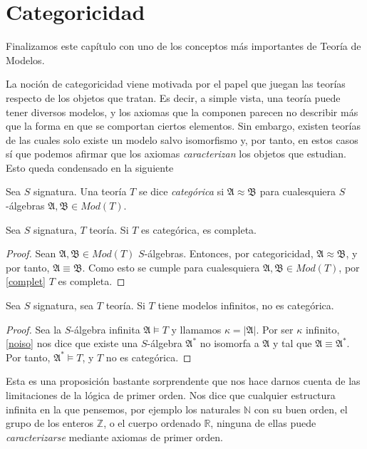 \section{Categoricidad}

Finalizamos este capítulo con uno de los conceptos más importantes de Teoría de Modelos. 

La noción de categoricidad viene motivada por el papel que juegan las teorías respecto de los objetos que tratan. Es decir, a simple vista, una teoría puede tener diversos modelos, y los axiomas que la componen parecen no describir más que la forma en que se comportan ciertos elementos. Sin embargo, existen teorías de las cuales solo existe un modelo salvo isomorfismo y, por tanto, en estos casos sí que podemos afirmar que los axiomas \textit{caracterizan} los objetos que estudian. Esto queda condensado en la siguiente 

\begin{definition}
Sea $S$ signatura. Una teoría $T$ se dice \textit{categórica} si $\mathfrak{A} \approx \mathfrak{B}$ para cualesquiera $S$-álgebras $\mathfrak{A}, \mathfrak{B} \in Mod(T)$. 
\end{definition}

\begin{prop}
Sea $S$ signatura, $T$ teoría. Si $T$ es categórica, es completa.
\end{prop}
\begin{proof}
Sean $\mathfrak{A}, \mathfrak{B} \in Mod(T)$ $S$-álgebras. Entonces, por categoricidad, $\mathfrak{A} \approx \mathfrak{B}$, y por tanto, $\mathfrak{A} \equiv \mathfrak{B}$. Como esto se cumple para cualesquiera $\mathfrak{A}, \mathfrak{B} \in Mod(T)$, por \ref{complet} $T$ es completa.
\end{proof}

\begin{prop}\label{infnocat}
Sea $S$ signatura, sea $T$ teoría. Si $T$ tiene modelos infinitos, no es categórica.
\end{prop}
\begin{proof}
Sea la $S$-álgebra infinita $\mathfrak{A}\vDash T$ y llamamos $\kappa= |\mathfrak{A}|$. Por ser $\kappa$ infinito, \ref{noiso} nos dice que existe una $S$-álgebra $\mathfrak{A}^{*}$ no isomorfa a $\mathfrak{A}$ y tal que $\mathfrak{A} \equiv \mathfrak{A}^{*}$. Por tanto, $\mathfrak{A}^{*} \vDash T$, y $T$ no es categórica.
\end{proof}

Esta es una proposición bastante sorprendente que nos hace darnos cuenta de las limitaciones de la lógica de primer orden. Nos dice que cualquier estructura infinita en la que pensemos, por ejemplo los naturales $\mathbb{N}$ con su buen orden, el grupo de los enteros $\mathbb{Z}$, o el cuerpo ordenado $\mathbb{R}$, ninguna de ellas puede \textit{caracterizarse} mediante axiomas de primer orden.

